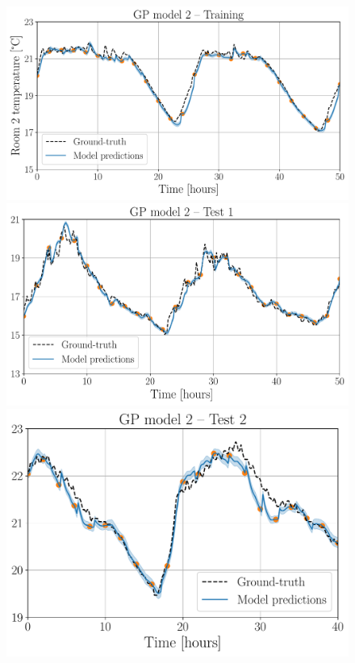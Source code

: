 {\begin{landscape}
\begin{figure}[!t]
	\includegraphics[scale=0.29]{../images/chap3_room_2_temp_model_train.pdf} 
	\includegraphics[scale=0.29]{../images/chap3_room_2_temp_model_test1.pdf}
	\includegraphics[scale=0.29]{../images/chap3_room_2_temp_model_test2.pdf} \\[10pt]

\end{figure}
\end{landscape}}
